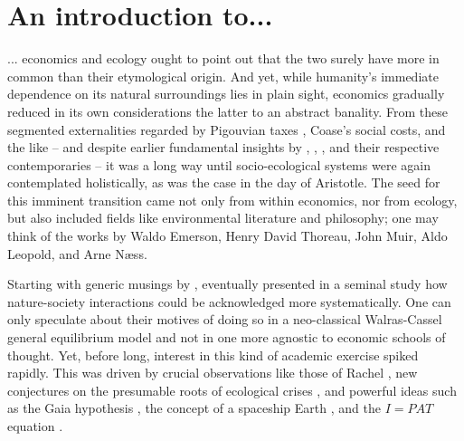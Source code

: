\section{An introduction to...}

... economics and ecology ought to point out that the two surely have more in common than their etymological origin. And yet, while humanity's immediate dependence on its natural surroundings lies in plain sight, economics gradually reduced in its own considerations the latter to an abstract banality. From these segmented externalities regarded by Pigouvian taxes \parencites{pigou_2017}[see also][]{baumol_1972}, Coase's \parencite*{coase_1960} social costs, and the like -- and despite earlier fundamental insights by \textcite{carlowitz_1713}, \textcite{jevons_1865}, \textcite{arrhenius_1896}, and their respective contemporaries -- it was a long way until socio-ecological systems were again contemplated holistically, as was the case in the day of Aristotle. The seed for this imminent transition came not only from within economics, nor from ecology, but also included fields like environmental literature and philosophy; one may think of the works by Waldo Emerson, Henry David Thoreau, John Muir, Aldo Leopold, and Arne Næss.

Starting with generic musings by \textcite{daly_1968,isard_1968,cumberland_1966}, \textcite{ayres_kneese_1969} eventually presented in a seminal study how nature-society interactions could be acknowledged more systematically. One can only speculate about their motives of doing so in a neo-classical Walras-Cassel general equilibrium model and not in one more agnostic to economic schools of thought. Yet, before long, interest in this kind of academic exercise spiked rapidly. This was driven by crucial observations like those of Rachel \textcite{carson_1962}, new conjectures on the presumable roots of ecological crises \parencite{white_1967}, and powerful ideas such as the Gaia hypothesis \parencite{lovelock_1972,lovelock_1974}, the concept of a spaceship Earth \parencite{boulding_1966}, and the $I=PAT$ equation \parencite{ehrlich_1972,commoner_1972,chertow_2001}.

